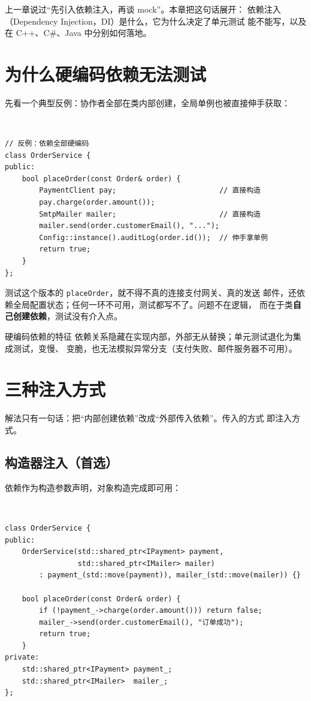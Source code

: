 \documentclass[12pt,a4paper,fontset=fandol]{ctexbook}
\newcommand{\cpplabel}{%
  \begin{tcolorbox}[enhanced,colback=cppheadbg,colframe=cppheadbg,
    arc=1mm,boxrule=0mm,left=6pt,right=6pt,top=2pt,bottom=2pt,
    halign=left,oversize]
    \textcolor{white}{\small\bfseries C++}
  \end{tcolorbox}\vspace{-4pt}}
\begin{document}
上一章说过“先引入依赖注入，再谈 mock”。本章把这句话展开：
依赖注入（Dependency Injection，DI）是什么，它为什么决定了单元测试
能不能写，以及在 C++、C\#、Java 中分别如何落地。

\section{为什么硬编码依赖无法测试}

先看一个典型反例：协作者全部在类内部创建，全局单例也被直接伸手获取：

\cpplabel
\begin{lstlisting}
// 反例：依赖全部硬编码
class OrderService {
public:
    bool placeOrder(const Order& order) {
        PaymentClient pay;                        // 直接构造
        pay.charge(order.amount());
        SmtpMailer mailer;                        // 直接构造
        mailer.send(order.customerEmail(), "...");
        Config::instance().auditLog(order.id());  // 伸手拿单例
        return true;
    }
};
\end{lstlisting}

测试这个版本的 \texttt{placeOrder}，就不得不真的连接支付网关、真的发送
邮件，还依赖全局配置状态；任何一环不可用，测试都写不了。问题不在逻辑，
而在于类\textbf{自己创建依赖}，测试没有介入点。

\begin{warning}{硬编码依赖的特征}
依赖关系隐藏在实现内部，外部无从替换；单元测试退化为集成测试，变慢、
变脆，也无法模拟异常分支（支付失败、邮件服务器不可用）。
\end{warning}

\section{三种注入方式}

解法只有一句话：把“内部创建依赖”改成“外部传入依赖”。传入的方式
即注入方式。

\subsection{构造器注入（首选）}

依赖作为构造参数声明，对象构造完成即可用：

\cpplabel
\begin{lstlisting}
class OrderService {
public:
    OrderService(std::shared_ptr<IPayment> payment,
                 std::shared_ptr<IMailer> mailer)
        : payment_(std::move(payment)), mailer_(std::move(mailer)) {}

    bool placeOrder(const Order& order) {
        if (!payment_->charge(order.amount())) return false;
        mailer_->send(order.customerEmail(), "订单成功");
        return true;
    }
private:
    std::shared_ptr<IPayment> payment_;
    std::shared_ptr<IMailer>  mailer_;
};
\end{lstlisting}
\end{document}
